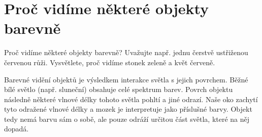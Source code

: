 \section{Proč vidíme některé objekty barevně}
Proč vidíme některé objekty barevně? Uvažujte např. jednu čerstvě ustřiženou červenou růži. Vysvětlete, proč 
vidíme stonek zeleně a květ červeně.

Barevné vidění objektů je výsledkem interakce světla s jejich povrchem. Běžné bílé světlo (např. sluneční) obsahuje celé 
spektrum barev. Povrch objektu následně některé vlnové délky tohoto světla pohltí a jiné odrazí. Naše oko zachytí tyto 
odražené vlnové délky a mozek je interpretuje jako příslušné barvy. Objekt tedy nemá barvu sám o sobě, ale pouze odráží 
určitou část světla, které na něj dopadá.